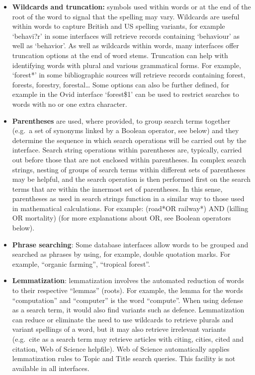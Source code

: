 \documentclass[
  letterpaper,
  DIV=11,
  numbers=noendperiod]{scrreprt}
\begin{document}
\begin{itemize}
\item
  \textbf{Wildcards and truncation:} symbols used within words or at the
  end of the root of the word to signal that the spelling may vary.
  Wildcards are useful within words to capture British and US spelling
  variants, for example `behavi?r' in some interfaces will retrieve
  records containing `behaviour' as well as `behavior'. As well as
  wildcards within words, many interfaces offer truncation options at
  the end of word stems. Truncation can help with identifying words with
  plural and various grammatical forms. For example, `forest*' in some
  bibliographic sources will retrieve records containing forest,
  forests, forestry, forestal\ldots{} Some options can also be further
  defined, for example in the Ovid interface `forest\$1' can be used to
  restrict searches to words with no or one extra character.
\item
  \textbf{Parentheses} are used, where provided, to group search terms
  together (e.g.~a set of synonyms linked by a Boolean operator, see
  below) and they determine the sequence in which search operations will
  be carried out by the interface. Search string operations within
  parentheses are, typically, carried out before those that are not
  enclosed within parentheses. In complex search strings, nesting of
  groups of search terms within different sets of parentheses may be
  helpful, and the search operation is then performed first on the
  search terms that are within the innermost set of parentheses. In this
  sense, parentheses as used in search strings function in a similar way
  to those used in mathematical calculations. For example: (road*OR
  railway*) AND (killing OR mortality) (for more explanations about OR,
  see Boolean operators below).
\item
  \textbf{Phrase searching}: Some database interfaces allow words to be
  grouped and searched as phrases by using, for example, double
  quotation marks. For example, ``organic farming'', ``tropical
  forest''.
\item
  \textbf{Lemmatization}: lemmatization involves the automated reduction
  of words to their respective ``lemmas'' (roots). For example, the
  lemma for the words ``computation'' and ``computer'' is the word
  ``compute''. When using defense as a search term, it would also find
  variants such as defence. Lemmatization can reduce or eliminate the
  need to use wildcards to retrieve plurals and variant spellings of a
  word, but it may also retrieve irrelevant variants (e.g.~cite as a
  search term may retrieve articles with citing, cities, cited and
  citation, Web of Science helpfile). Web of Science automatically
  applies lemmatization rules to Topic and Title search queries. This
  facility is not available in all interfaces.
\end{itemize}
\end{document}
